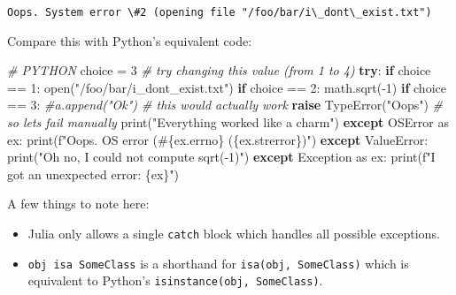 \documentclass[11pt]{article}
\providecommand{\tightlist}{%
      \setlength{\itemsep}{0pt}\setlength{\parskip}{0pt}}
\newenvironment{Shaded}{}{}
\newcommand{\DecValTok}[1]{\textcolor[rgb]{0.25,0.63,0.44}{{#1}}}
\newcommand{\StringTok}[1]{\textcolor[rgb]{0.25,0.44,0.63}{{#1}}}
\newcommand{\CommentTok}[1]{\textcolor[rgb]{0.38,0.63,0.69}{\textit{{#1}}}}
\newcommand{\NormalTok}[1]{{#1}}
\newcommand{\SpecialCharTok}[1]{\textcolor[rgb]{0.25,0.44,0.63}{{#1}}}
\newcommand{\SpecialStringTok}[1]{\textcolor[rgb]{0.73,0.40,0.53}{{#1}}}
\newcommand{\ImportTok}[1]{{#1}}
\newcommand{\ControlFlowTok}[1]{\textcolor[rgb]{0.00,0.44,0.13}{\textbf{{#1}}}}
\newcommand{\OperatorTok}[1]{\textcolor[rgb]{0.40,0.40,0.40}{{#1}}}
\newcommand{\BuiltInTok}[1]{{#1}}
\newcommand{\PreprocessorTok}[1]{\textcolor[rgb]{0.74,0.48,0.00}{{#1}}}
\begin{document}
    \begin{Verbatim}[commandchars=\\\{\}]
Oops. System error \#2 (opening file "/foo/bar/i\_dont\_exist.txt")
    \end{Verbatim}

    Compare this with Python's equivalent code:

\begin{Shaded}
\begin{Highlighting}[]
\CommentTok{\# PYTHON}
\NormalTok{choice }\OperatorTok{=} \DecValTok{3} \CommentTok{\# try changing this value (from 1 to 4)}
\ControlFlowTok{try}\NormalTok{:}
  \ControlFlowTok{if}\NormalTok{ choice }\OperatorTok{==} \DecValTok{1}\NormalTok{:}
      \BuiltInTok{open}\NormalTok{(}\StringTok{"/foo/bar/i\_dont\_exist.txt"}\NormalTok{)}
  \ControlFlowTok{if}\NormalTok{ choice }\OperatorTok{==} \DecValTok{2}\NormalTok{:}
\NormalTok{      math.sqrt(}\OperatorTok{{-}}\DecValTok{1}\NormalTok{)}
  \ControlFlowTok{if}\NormalTok{ choice }\OperatorTok{==} \DecValTok{3}\NormalTok{:}
      \CommentTok{\#a.append("Ok") \# this would actually work}
      \ControlFlowTok{raise} \PreprocessorTok{TypeError}\NormalTok{(}\StringTok{"Oops"}\NormalTok{) }\CommentTok{\# so let\textquotesingle{}s fail manually}
  \BuiltInTok{print}\NormalTok{(}\StringTok{"Everything worked like a charm"}\NormalTok{)}
\ControlFlowTok{except} \PreprocessorTok{OSError} \ImportTok{as}\NormalTok{ ex:}
    \BuiltInTok{print}\NormalTok{(}\SpecialStringTok{f"Oops. OS error (\#}\SpecialCharTok{\{ex.}\NormalTok{errno}\SpecialCharTok{\}}\SpecialStringTok{ (}\SpecialCharTok{\{ex.}\NormalTok{strerror}\SpecialCharTok{\}}\SpecialStringTok{)"}\NormalTok{)}
\ControlFlowTok{except} \PreprocessorTok{ValueError}\NormalTok{:}
    \BuiltInTok{print}\NormalTok{(}\StringTok{"Oh no, I could not compute sqrt({-}1)"}\NormalTok{)}
\ControlFlowTok{except} \PreprocessorTok{Exception} \ImportTok{as}\NormalTok{ ex:}
    \BuiltInTok{print}\NormalTok{(}\SpecialStringTok{f"I got an unexpected error: }\SpecialCharTok{\{ex\}}\SpecialStringTok{"}\NormalTok{)}
\end{Highlighting}
\end{Shaded}

    A few things to note here:

\begin{itemize}
\tightlist
\item
  Julia only allows a single \texttt{catch} block which handles all
  possible exceptions.
\item
  \texttt{obj\ isa\ SomeClass} is a shorthand for
  \texttt{isa(obj,\ SomeClass)} which is equivalent to Python's
  \texttt{isinstance(obj,\ SomeClass)}.
\end{itemize}
\end{document}
